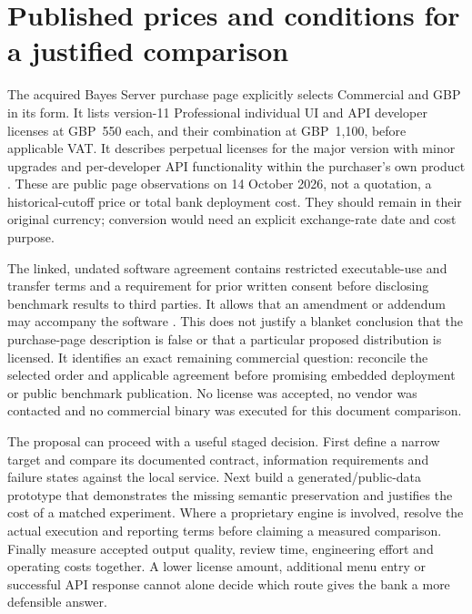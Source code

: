 \section{Published prices and conditions for a justified comparison}

The acquired Bayes Server purchase page explicitly selects Commercial and GBP
in its form. It lists version-11 Professional individual UI and API developer
licenses at GBP~550 each, and their combination at GBP~1,100, before applicable
VAT. It describes perpetual licenses for the major version with minor upgrades
and per-developer API functionality within the purchaser's own product
\citep{exec14_ci_purchase}. These are public page observations on
14 October 2026, not a quotation, a historical-cutoff price or total bank
deployment cost. They should remain in their original currency; conversion
would need an explicit exchange-rate date and cost purpose.

The linked, undated software agreement contains restricted executable-use and
transfer terms and a requirement for prior written consent before disclosing
benchmark results to third parties. It allows that an amendment or addendum
may accompany the software \citep{exec14_ci_eula}. This does not justify a
blanket conclusion that the purchase-page description is false or that a
particular proposed distribution is licensed. It identifies an exact remaining
commercial question: reconcile the selected order and applicable agreement
before promising embedded deployment or public benchmark publication. No
license was accepted, no vendor was contacted and no commercial binary was
executed for this document comparison.

The proposal can proceed with a useful staged decision. First define a narrow
target and compare its documented contract, information requirements and
failure states against the local service. Next build a generated/public-data
prototype that demonstrates the missing semantic preservation and justifies
the cost of a matched experiment. Where a proprietary engine is involved,
resolve the actual execution and reporting terms before claiming a measured
comparison. Finally measure accepted output quality, review time, engineering
effort and operating costs together. A lower license amount, additional menu
entry or successful API response cannot alone decide which route gives the
bank a more defensible answer.
\label{exec14:commercial-contracts-end}
